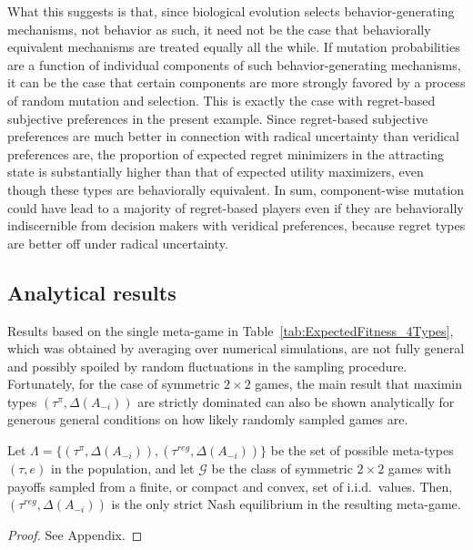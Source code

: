 \documentclass[fleqn,reqno,11pt]{article}
\begin{document}
What this suggests is that, since biological evolution selects behavior-generating mechanisms,
not behavior as such, it need not be the case that behaviorally equivalent mechanisms are
treated equally all the while. If mutation probabilities are a function of individual
components of such behavior-generating mechanisms, it can be the case that certain components
are more strongly favored by a process of random mutation and selection. This is exactly the
case with regret-based subjective preferences in the present example. Since regret-based
subjective preferences are much better in connection with radical uncertainty than veridical
preferences are, the proportion of expected regret minimizers in the attracting state is
substantially higher than that of expected utility maximizers, even though these types are
behaviorally equivalent. In sum, component-wise mutation could have lead to a majority of
regret-based players even if they are behaviorally indiscernible from decision makers with
veridical preferences, because regret types are better off under radical uncertainty.

\subsection{Analytical results}
\label{sec:analytical-results}

Results based on the single meta-game in Table~\ref{tab:ExpectedFitness_4Types}, which was
obtained by averaging over numerical simulations, are not fully general and possibly spoiled by
random fluctuations in the sampling procedure. Fortunately, for the case of symmetric
$2 \times 2$ games, the main result that maximin types $(\tau^{\pi}, \Delta(A_{-i}))$ are
strictly dominated can also be shown analytically for generous general conditions on how likely
randomly sampled games are.

\begin{proposition} \label{proposition1}

  Let $\Lambda = \lbrace (\tau^{\pi}, \Delta(A_{-i})), (\tau^{reg}, \Delta(A_{-i})) \rbrace$ be
  the set of possible meta-types $(\tau, e)$ in the population, and let $\mathcal{G}$ be the class
  of symmetric $2 \times 2$ games with payoffs sampled from a finite, or compact and convex,
  set of i.i.d.~values. Then, $(\tau^{reg}, \Delta(A_{-i}))$ is the only strict Nash
  equilibrium in the resulting meta-game.

\end{proposition}

\begin{proof}
See Appendix.
\end{proof}
\end{document}
